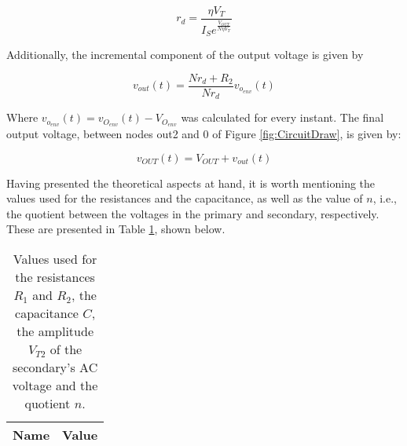 \begin{equation} \label{eq:incremental_resistance}
  r_d=\frac{\eta V_T}{I_Se^{\frac{V_{OUT}}{N\eta V_T}}}
\end{equation}

Additionally, the incremental component of the output voltage is given by

\begin{equation} \label{eq:incremental_voltage}
  v_{out}(t)=\frac{Nr_d+R_2}{Nr_d}v_{o_{env}}(t)
\end{equation}

Where $v_{o_{env}}(t)=v_{O_{env}}(t)-V_{O_{env}}$ was calculated for every instant. The final output voltage, between nodes out2 and 0 of Figure \ref{fig:CircuitDraw}, is given by:

\begin{equation} \label{eq:final_output_voltage}
  v_{OUT}(t)=V_{OUT}+v_{out}(t)
\end{equation}

Having presented the theoretical aspects at hand, it is worth mentioning the values used for the resistances and the capacitance, as well as the value of $n$, i.e., the quotient between the voltages in the primary and secondary, respectively. These are presented in Table \ref{tab:ChosenValues}, shown below.

\begin{table}[H]
  \centering
  \begin{tabular}{|c|c|}
    \hline    
    {\bf Name} & {\bf Value} \\ \hline
    
  \end{tabular}
  \caption{Values used for the resistances $R_1$ and $R_2$, the capacitance $C$, the amplitude $V_{T2}$ of the secondary's AC voltage and the quotient $n$.}
  \label{tab:ChosenValues}
\end{table}

